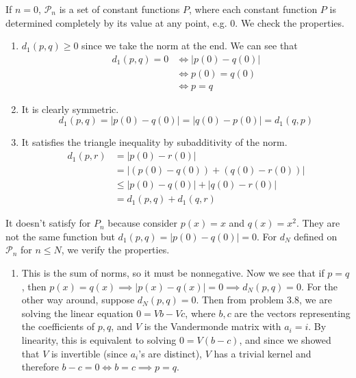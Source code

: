   \begin{solution}
    If $n = 0$, $\mathcal{P}_n$ is a set of constant functions $P$, where each constant function $P$ is determined completely by its value at any point, e.g. $0$. We check the properties. 
    \begin{enumerate}
      \item $d_1 (p, q) \geq 0$ since we take the norm at the end. We can see that 
      \begin{align}
        d_1 (p, q) = 0 & \iff |p(0) - q(0)| \\
                       & \iff p(0) = q(0) \\
                       & \iff p = q
      \end{align} 

      \item It is clearly symmetric. 
      \begin{equation}
        d_1 (p, q) = |p(0) - q(0)| = |q(0) - p(0)| = d_1(q, p)
      \end{equation}

      \item It satisfies the triangle inequality by subadditivity of the norm. 
      \begin{align}
        d_1 (p, r) & = |p(0) - r(0)| \\
                   & = |(p(0) - q(0)) + (q(0) - r(0))| \\
                   & \leq |p(0) - q(0)| + |q(0) - r(0)| \\
                   & = d_1 (p, q) + d_1 (q, r)
      \end{align}
    \end{enumerate}
    It doesn't satisfy for $P_n$ because consider $p(x) = x$ and $q(x) = x^2$. They are not the same function but $d_1 (p, q) = |p(0) - q(0)| = 0$. For $d_N$ defined on $\mathcal{P}_n$ for $n \leq N$, we verify the properties. 
    \begin{enumerate}
      \item This is the sum of norms, so it must be nonnegative. Now we see that if $p = q$, then $p(x) = q(x) \implies |p(x) - q(x)| = 0 \implies d_N (p, q) = 0$. For the other way around, suppose $d_N(p, q) = 0$. Then from problem 3.8, we are solving the linear equation $0 = V b - V c$, where $b, c$ are the vectors representing the coefficients of $p, q$, and $V$ is the Vandermonde matrix with $a_i = i$. By linearity, this is equivalent to solving $0 = V(b - c)$, and since we showed that $V$ is invertible (since $a_i$'s are distinct), $V$ has a trivial kernel and therefore $b - c = 0 \iff b = c \implies p = q$. 


\end{enumerate}
\end{solution}
